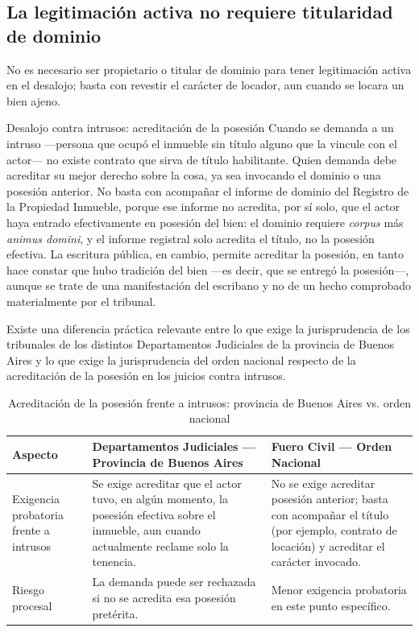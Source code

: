 \documentclass[12pt,oneside]{book}
\begin{document}
\subsection{La legitimación activa no requiere titularidad de dominio}

No es necesario ser propietario o titular de dominio para tener legitimación activa en el desalojo; basta con revestir el carácter de locador, aun cuando se locara un bien ajeno.

\begin{example}{Desalojo contra intrusos: acreditación de la posesión}
Cuando se demanda a un intruso ---persona que ocupó el inmueble sin título alguno que la vincule con el actor--- no existe contrato que sirva de título habilitante. Quien demanda debe acreditar su mejor derecho sobre la cosa, ya sea invocando el dominio o una posesión anterior. No basta con acompañar el informe de dominio del Registro de la Propiedad Inmueble, porque ese informe no acredita, por sí solo, que el actor haya entrado efectivamente en posesión del bien: el dominio requiere \textit{corpus} más \textit{animus domini}, y el informe registral solo acredita el título, no la posesión efectiva. La escritura pública, en cambio, permite acreditar la posesión, en tanto hace constar que hubo tradición del bien ---es decir, que se entregó la posesión---, aunque se trate de una manifestación del escribano y no de un hecho comprobado materialmente por el tribunal.
\end{example}

Existe una diferencia práctica relevante entre lo que exige la jurisprudencia de los tribunales de los distintos Departamentos Judiciales de la provincia de Buenos Aires y lo que exige la jurisprudencia del orden nacional respecto de la acreditación de la posesión en los juicios contra intrusos.

\begin{table}[H]
\centering
\caption{Acreditación de la posesión frente a intrusos: provincia de Buenos Aires vs. orden nacional}
\begin{tabularx}{\textwidth}{>{\raggedright\arraybackslash}p{} X X}
\toprule
\textbf{Aspecto} & \textbf{Departamentos Judiciales --- Provincia de Buenos Aires} & \textbf{Fuero Civil --- Orden Nacional} \\
\midrule
Exigencia probatoria frente a intrusos & Se exige acreditar que el actor tuvo, en algún momento, la posesión efectiva sobre el inmueble, aun cuando actualmente reclame solo la tenencia. & No se exige acreditar posesión anterior; basta con acompañar el título (por ejemplo, contrato de locación) y acreditar el carácter invocado. \\
Riesgo procesal & La demanda puede ser rechazada si no se acredita esa posesión pretérita. & Menor exigencia probatoria en este punto específico. \\
\bottomrule
\end{tabularx}
\end{table}
\end{document}
